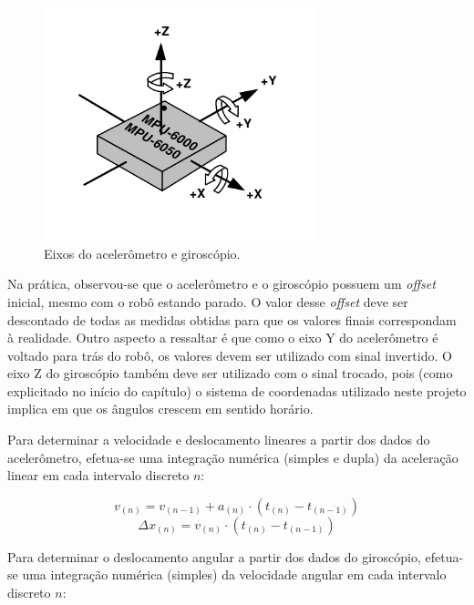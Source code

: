 \begin{figure}[H]
	\centering
	\includegraphics[width=0.7\textwidth]{./figuras/hardware/eixos_mpu.png}
	\caption{Eixos do acelerômetro e giroscópio.}
	\label{fig:eixos_acel_giro}
\end{figure}

Na prática, observou-se que o acelerômetro e o giroscópio possuem um \textit{offset} inicial, mesmo com o robô estando parado. O valor desse \textit{offset} deve ser descontado de todas as medidas obtidas para que os valores finais correspondam à realidade. Outro aspecto a ressaltar é que como o eixo Y do acelerômetro é voltado para trás do robô, os valores devem ser utilizado com sinal invertido. O eixo Z do giroscópio também deve ser utilizado com o sinal trocado, pois (como explicitado no início do capítulo) o sistema de coordenadas utilizado neste projeto implica em que os ângulos crescem em sentido horário.

Para determinar a velocidade e deslocamento lineares a partir dos dados do acelerômetro, efetua-se uma integração numérica (simples e dupla) da aceleração linear em cada intervalo discreto $n$:

\begin{equation}
  v_{(n)} = v_{(n - 1)} + a_{(n)} \cdot (t_{(n)} - t_{(n-1)})
  \label{eq:v_acelerometro}
\end{equation}
\begin{equation}
  \Delta x_{(n)} = v_{(n)} \cdot (t_{(n)} - t_{(n-1)})
  \label{eq:x_acelerometro}
\end{equation}

Para determinar o deslocamento angular a partir dos dados do giroscópio, efetua-se uma integração numérica (simples) da velocidade angular em cada intervalo discreto $n$:

